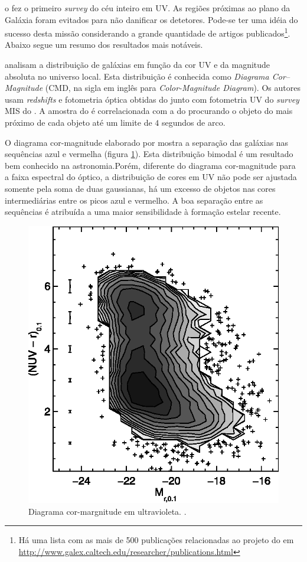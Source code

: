 o \galex fez o primeiro {\em survey} do céu inteiro em UV. As regiões próximas
ao plano da Galáxia foram evitados para não danificar os detetores. Pode-se ter
uma idéia do sucesso desta missão considerando a grande quantidade de artigos
publicados\footnote{Há uma lista com as mais de 500 publicações relacionadas ao
projeto do \galex em
\url{http://www.galex.caltech.edu/researcher/publications.html}}. Abaixo segue
um resumo dos resultados mais notáveis.

\citet{Wyder2007} analisam a distribuição de galáxias em função da cor UV e da
magnitude absoluta no universo local. Esta distribuição é conhecida como {\em
Diagrama Cor--Magnitude} (CMD, na sigla em inglês para {\em Color-Magnitude
Diagram}). Os autores usam {\em redshifts} e fotometria óptica obtidas do \SDSS
junto com fotometria UV do {\em survey} MIS do \galex. A amostra do \SDSS é
correlacionada com a do \galex procurando o objeto do \galex mais próximo de
cada objeto \SDSS até um limite de $4$ segundos de arco.

O diagrama cor-magnitude elaborado por \citeauthor{Wyder2007} mostra a separação
das galáxias nas sequências azul e vermelha (figura \ref{fig:WyderCMD}). Esta
distribuição bimodal é um resultado bem conhecido na astronomia.\citneed Porém,
diferente do diagrama cor-magnitude para a faixa espectral do óptico, a
distribuição de cores em UV não pode ser ajustada somente pela soma de duas
gaussianas, há um excesso de objetos nas cores intermediárias entre os picos
azul e vermelho. A boa separação entre as sequências é atribuída a uma maior
sensibilidade à formação estelar recente.

\begin{figure}
	\includegraphics[width=0.7\columnwidth]{figuras/cmd-wyder.eps}
	\caption[Diagrama cor-margnitude em ultravioleta.]
	{Diagrama cor-margnitude em ultravioleta. \citep[figura 7]{Wyder2007}.}
	\label{fig:WyderCMD}
\end{figure}

